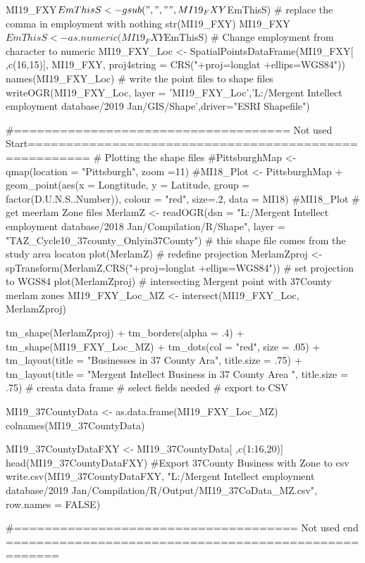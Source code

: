 MI19_FXY$EmThisS <- gsub(",", "",MI19_FXY$EmThisS) # replace the comma in employment with nothing
str(MI19_FXY)
MI19_FXY$EmThisS <- as.numeric(MI19_FXY$EmThisS) # Change employment from character to numeric
MI19_FXY_Loc <- SpatialPointsDataFrame(MI19_FXY[ ,c(16,15)], MI19_FXY,
                                   proj4string = CRS("+proj=longlat +ellips=WGS84"))
names(MI19_FXY_Loc)
# write the point files to shape files
writeOGR(MI19_FXY_Loc, layer = 'MI19_FXY_Loc','L:/Mergent Intellect employment database/2019 Jan/GIS/Shape',driver="ESRI Shapefile")


#==================================== Not used Start======================================================
# Plotting the shape files
#PittsburghMap <- qmap(location = "Pittsburgh", zoom =11)
#MI18_Plot <- PittsburghMap + geom_point(aes(x = Longtitude, y = Latitude, group = factor(D.U.N.S..Number)), colour = "red", size=.2, data = MI18)
#MI18_Plot
# get meerlam Zone files
MerlamZ <- readOGR(dsn = "L:/Mergent Intellect employment database/2018 Jan/Compilation/R/Shape", layer = "TAZ_Cycle10_37county_Onlyin37County") # this shape file comes from the study area locaton 
plot(MerlamZ)
# redefine projection
MerlamZproj <- spTransform(MerlamZ,CRS("+proj=longlat +ellips=WGS84")) # set projection to WGS84
plot(MerlamZproj)
# intersecting Mergent point with 37County merlam zones
MI19_FXY_Loc_MZ <- intersect(MI19_FXY_Loc, MerlamZproj) 

tm_shape(MerlamZproj) + tm_borders(alpha = .4) +
  tm_shape(MI19_FXY_Loc_MZ) + tm_dots(col = "red", size = .05) +
  tm_layout(title = "Businesses in  37 County Ara", title.size = .75) +
  tm_layout(title = "Mergent  Intellect Business in 37 County Area ", title.size = .75)
# creata data frame
# select fields needed 
# export to CSV

MI19_37CountyData <- as.data.frame(MI19_FXY_Loc_MZ)
colnames(MI19_37CountyData)

MI19_37CountyDataFXY <- MI19_37CountyData[ ,c(1:16,20)]
head(MI19_37CountyDataFXY)
#Export 37County Business with Zone to csv
write.csv(MI19_37CountyDataFXY, "L:/Mergent Intellect employment database/2019 Jan/Compilation/R/Output/MI19_37CoData_MZ.csv", row.names = FALSE)

#===================================== Not used end =====================================================



